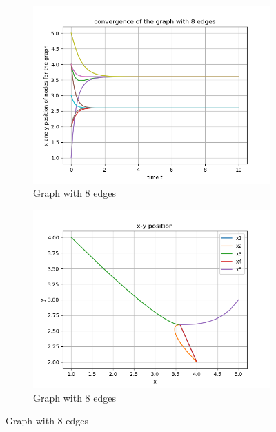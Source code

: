 \documentclass{article}
\begin{document}
\begin{problem}
\begin{figure}
\begin{subfigure}{0.4\textwidth}
            \includegraphics[width=\textwidth]{./img/Figure_7.png}
            \caption{Graph with 8 edges}
        \end{subfigure}
        \begin{subfigure}{0.4\textwidth}
            \includegraphics[width=\textwidth]{./img/Figure_8.png}
            \caption{Graph with 8 edges}
        \end{subfigure}
    \end{figure}
    \begin{figure}
        \centering
        \begin{subfigure}{0.4\textwidth}

\end{subfigure}
\end{figure}
\end{problem}
\end{document}
